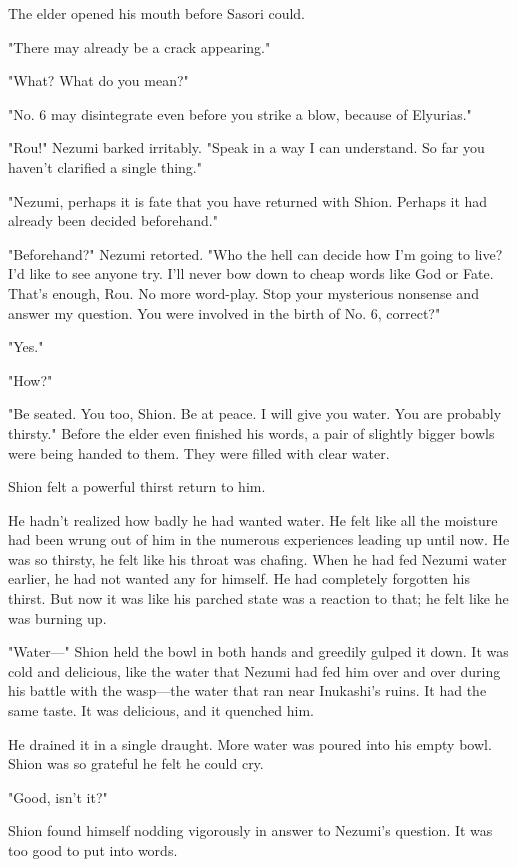 The elder opened his mouth before Sasori could.

"There may already be a crack appearing."

"What? What do you mean?"

"No. 6 may disintegrate even before you strike a blow, because of
Elyurias."

"Rou!" Nezumi barked irritably. "Speak in a way I can understand. So far
you haven't clarified a single thing."

"Nezumi, perhaps it is fate that you have returned with Shion. Perhaps
it had already been decided beforehand."

"Beforehand?" Nezumi retorted. "Who the hell can decide how I'm going to
live? I'd like to see anyone try. I'll never bow down to cheap words
like God or Fate. That's enough, Rou. No more word-play. Stop your
mysterious nonsense and answer my question. You were involved in the
birth of No. 6, correct?"

"Yes."

"How?"

"Be seated. You too, Shion. Be at peace. I will give you water. You are
probably thirsty." Before the elder even finished his words, a pair of
slightly bigger bowls were being handed to them. They were filled with
clear water.

Shion felt a powerful thirst return to him.

He hadn't realized how badly he had wanted water. He felt like all the
moisture had been wrung out of him in the numerous experiences leading
up until now. He was so thirsty, he felt like his throat was chafing.
When he had fed Nezumi water earlier, he had not wanted any for himself.
He had completely forgotten his thirst. But now it was like his parched
state was a reaction to that; he felt like he was burning up.

"Water---" Shion held the bowl in both hands and greedily gulped it down.
It was cold and delicious, like the water that Nezumi had fed him over
and over during his battle with the wasp---the water that ran near
Inukashi's ruins. It had the same taste. It was delicious, and it
quenched him.

He drained it in a single draught. More water was poured into his empty
bowl. Shion was so grateful he felt he could cry.

"Good, isn't it?"

Shion found himself nodding vigorously in answer to Nezumi's question.
It was too good to put into words.

